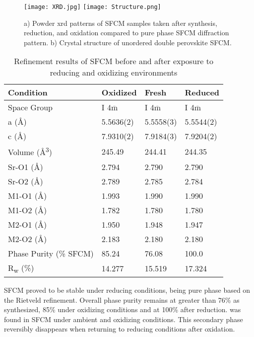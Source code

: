     \begin{figure}
      \texttt{[image: XRD.jpg]}
      \texttt{[image: Structure.png]}
      \caption{a) Powder \gls{xrd} patterns of SFCM samples taken after synthesis, reduction, and oxidation compared to pure phase SFCM diffraction pattern. b) Crystal structure of unordered double perovskite SFCM. }
      \label{fig:structure}
    \end{figure}

    \begin{table}
        \centering
        \caption{Refinement results of SFCM before and after exposure to reducing and oxidizing environments}
        \label{tab:xrdrefine}
        \begin{tabular}{llll}
        Condition & Oxidized & Fresh   & Reduced  \\
        \hline
        Space Group                & I 4$\overline{\text{m}}$    & I 4$\overline{\text{m}}$   & I 4$\overline{\text{m}}$    \\
        a (\si{\angstrom})        & 5.5636(2)   & 5.5558(3)  & 5.5544(2)   \\
        c (\si{\angstrom})        & 7.9310(2)   & 7.9184(3)  & 7.9204(2)   \\
        Volume (\si{\angstrom\cubed}) & 245.49  & 244.41 & 244.35  \\
        Sr-O1 (\si{\angstrom})    & 2.794  & 2.790 & 2.790   \\
        Sr-O2 (\si{\angstrom})    & 2.789  & 2.785 & 2.784   \\
        M1-O1 (\si{\angstrom})    & 1.993  & 1.990 & 1.990   \\
        M1-O2 (\si{\angstrom})    & 1.782  & 1.780 & 1.780   \\
        M2-O1 (\si{\angstrom})    & 1.950  & 1.948 & 1.947   \\
        M2-O2 (\si{\angstrom})    & 2.183  & 2.180 & 2.180   \\
        Phase Purity (\% SFCM)    & 85.24  & 76.08 & 100.0   \\
        R\textsubscript{w} (\%)   & 14.277 & 15.519 & 17.324
        \end{tabular}
        \end{table}

    SFCM proved to be stable under reducing conditions, being pure phase based on the Rietveld refinement.
    Overall phase purity remains at greater than 76\% as synthesized, 85\% under oxidizing conditions and at 100\% after reduction.
     was found in SFCM under ambient and oxidizing conditions.
    This secondary phase reversibly disappears when returning to reducing conditions after oxidation.

